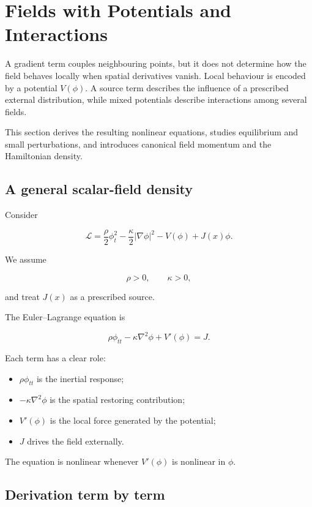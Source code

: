 \section{Fields with Potentials and Interactions}
\label{sec:fields_with_potentials_and_interactions}

A gradient term couples neighbouring points, but it does not determine how the field behaves locally when spatial derivatives vanish. Local behaviour is encoded by a potential \(V(\phi)\). A source term describes the influence of a prescribed external distribution, while mixed potentials describe interactions among several fields.

This section derives the resulting nonlinear equations, studies equilibrium and small perturbations, and introduces canonical field momentum and the Hamiltonian density.

\subsection{A general scalar-field density}

Consider

\[
\boxed{
\mathcal{L}
=
\frac{\rho}{2}\phi_{t}^{2}
-
\frac{\kappa}{2}|\nabla\phi|^{2}
-
V(\phi)
+
J(x)\phi
}.
\]

We assume

\[
\rho>0,
\qquad
\kappa>0,
\]

and treat \(J(x)\) as a prescribed source.

The Euler--Lagrange equation is

\[
\boxed{
\rho\phi_{tt}
-
\kappa\nabla^{2}\phi
+
V'(\phi)
=
J
}.
\]

Each term has a clear role:

\begin{itemize}
    \item \(\rho\phi_{tt}\) is the inertial response;
    \item \(-\kappa\nabla^{2}\phi\) is the spatial restoring contribution;
    \item \(V'(\phi)\) is the local force generated by the potential;
    \item \(J\) drives the field externally.
\end{itemize}

The equation is nonlinear whenever \(V'(\phi)\) is nonlinear in \(\phi\).

\subsection{Derivation term by term}

